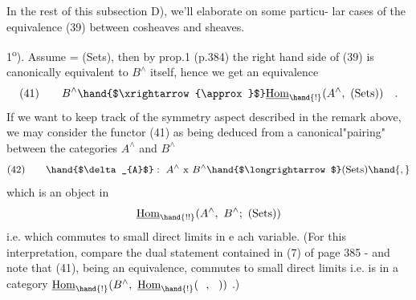In the rest of this subsection D), we'll elaborate on some particu-%
lar cases of the equivalence (39) between cosheaves and sheaves.

\deleted{(}1\textsuperscript{o}). Assume  = (Sets), then by prop.1 (p.384) the right hand
side of (39) is canonically equivalent to $B^{\wedge}$ itself, hence we get an
equivalence
\[ (41)\qquad B^{\wedge} \hand{$\xrightarrow{\approx}$} \underline{\mathrm{Hom}}_{\hand{!}}(A^{\wedge},\ (\mathrm{Sets})) \quad . \]
If we want to keep track of the symmetry aspect described in the remark
above, we may consider  the functor (41) as being deduced from a
canonical"pairing" between the categories $A^{\wedge}$ and $B^{\wedge}$
\[ (42)\qquad \hand{$\delta_{A}$}:\ A^{\wedge}\ \mathrm{x}\ B^{\wedge} \hand{$\longrightarrow$} (\mathrm{Sets}) \hand{,} \]
which is an object in
\[ \underline{\mathrm{Hom}}_{\hand{!!}}(A^{\wedge},\ B^{\wedge};\ (\mathrm{Sets})) \]
i.e. which commutes to small direct limits in e ach variable. (For this
interpretation, compare the dual statement contained in  (7) of
page 385 - and note that (41), being an equivalence, commutes to
small direct limits i.e. is in a category $\underline{\mathrm{Hom}}_{\hand{!}}(B^{\wedge},\ \underline{\mathrm{Hom}}_{\hand{!}}(\ \ ,\ \ ))$ .)

